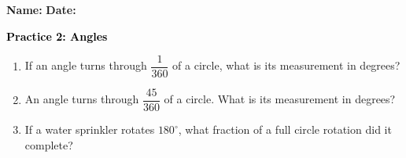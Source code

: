 \documentclass[12pt, letterpaper, fleqn]{article}
\begin{document}
\textbf{Name:} \underline{\hspace{5cm}}
\hfill
\textbf{Date:} \underline{\hspace{3cm}}\\

\begin{tcolorbox}[colback=customteal!20]
    \large\textcolor{black}{\textbf{Practice 2: Angles}}
\end{tcolorbox}
\begin{enumerate}[itemsep=3.5cm, leftmargin=0.6cm]
\item If an angle turns through $\dfrac{1}{360}$ of a circle, what is its measurement in degrees?
\vspace{3.5cm}
\item An angle turns through $\dfrac{45}{360}$ of a circle. What is its measurement in degrees?
\vspace{3.5cm}
\item If a water sprinkler rotates $180^\circ$, what fraction of a full circle rotation did it complete?
\end{enumerate}
\end{document}
